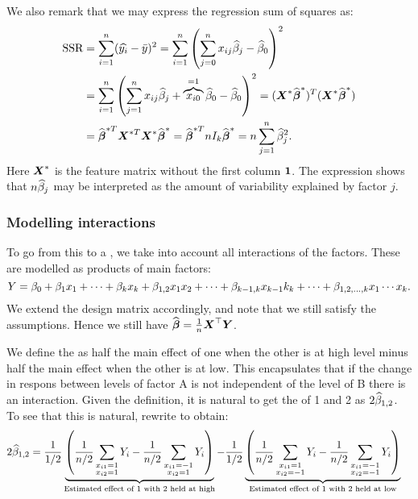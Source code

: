We also remark that we may express the regression sum of squares as:
\begin{align*}
    \textrm{SSR} 
    &= \sum_{i=1}^{n} (\widehat{y_i} - \bar{y})^2 
    = \sum_{i=1}^{n} \left( \sum_{j=0}^{n} x_{ij} \widehat{\beta}_j - \widehat{\beta}_0 \right)^2 
    \\&= \sum_{i=1}^{n} \left( \sum_{j=1}^{n} x_{ij} \widehat{\beta}_j + \overbrace{x_{i0}}^{=1} \widehat{\beta}_0 - \widehat{\beta}_0 \right)^2
    = (\boldsymbol{X}^* \widehat{\boldsymbol{\beta}}^*)^T (\boldsymbol{X}^* \widehat{\boldsymbol{\beta}}^*)
    \\&= \widehat{\boldsymbol{\beta}}^{*T} \boldsymbol{X}^{*T} \boldsymbol{X}^* \widehat{\boldsymbol{\beta}}^* 
    = \widehat{\boldsymbol{\beta}}^{*T} n I_k \widehat{\boldsymbol{\beta}}^* 
    = n \sum_{j=1}^{n} \widehat{\beta}_j^2.
\end{align*}
Here $\boldsymbol{X}^*$ is the feature matrix without the first column $\boldsymbol{1}$. The expression shows that $n\widehat{\beta}_j$ may be interpreted as the amount of variability explained by factor $j$.

\subsubsection{Modelling interactions}

To go from this to a , we take into account all interactions of the factors. These are modelled as products of main factors:
$$
    Y = \beta_0 + \beta_1x_1+\dots+\beta_kx_k + \beta_{1,2}x_1x_2 + \dots+\beta_{k-1,k}x_{k-1}k_{k}+\dots+\beta_{1,2,\dots,k}x_1\cdots x_k.
$$
We extend the design matrix accordingly, and note that we still satisfy the assumptions. Hence we still have $\widehat{\boldsymbol{\beta}} = \frac{1}{n}\boldsymbol{X}^\top\boldsymbol{Y}$. 

We define the  as half the main effect of one when the other is at high level minus half the main effect when the other is at low. This encapsulates that if the change in respons between levels of factor A is not independent of the level of B there is an interaction. Given the definition, it is natural to get the  of 1 and 2 as $2\widehat{\beta}_{1,2}$. To see that this is natural, rewrite to obtain:
\begin{align*}
    2\widehat{\beta}_{1,2} 
    &= \frac{1}{1/2}\underbrace{\left( \frac{1}{n/2}\sum_{\substack{x_{i1} = 1 \\ x_{i2} =  1}} Y_i - \frac{1}{n/2}\sum_{\substack{x_{i1} = -1 \\ x_{i2} =  1}} Y_i \right)}_{\textrm{Estimated effect of 1 with 2 held at high}}
    -\frac{1}{1/2}\underbrace{\left( \frac{1}{n/2}\sum_{\substack{x_{i1} = 1 \\ x_{i2} = -1}} Y_i - \frac{1}{n/2}\sum_{\substack{x_{i1} = -1 \\ x_{i2} = -1}} Y_i \right)}_{\textrm{Estimated effect of 1 with 2 held at low}}
\end{align*}

